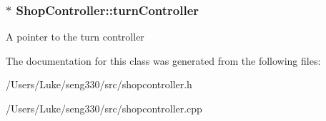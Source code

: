 \subsubsection[{turn\+Controller}]{$\ast$ Shop\+Controller\+::turn\+Controller}\label{class_shop_controller_a3d14a370bf604d6f52f3a94749dd1913}
A pointer to the turn controller 

The documentation for this class was generated from the following files\+:\begin{DoxyCompactItemize}
\item 
/\+Users/\+Luke/seng330/src/shopcontroller.\+h\item 
/\+Users/\+Luke/seng330/src/shopcontroller.\+cpp\end{DoxyCompactItemize}
